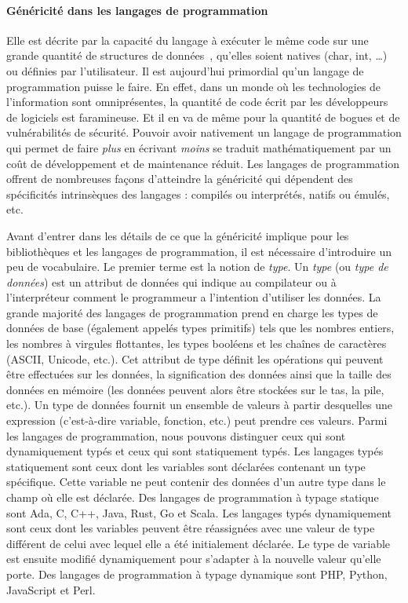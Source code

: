 \paragraph{Généricité dans les langages de programmation} Elle est décrite par la capacité du langage à exécuter le même
code sur une grande quantité de structures de données~\parencite{dehnert.1998.fundamentals}, qu'elles soient natives
(char, int, \ldots) ou définies par l'utilisateur. Il est aujourd'hui primordial qu'un langage de programmation puisse
le faire. En effet, dans un monde où les technologies de l'information sont omniprésentes, la quantité de code écrit par
les développeurs de logiciels est faramineuse. Et il en va de même pour la quantité de bogues et de vulnérabilités de
sécurité. Pouvoir avoir nativement un langage de programmation qui permet de faire \emph{plus} en écrivant \emph{moins}
se traduit mathématiquement par un coût de développement et de maintenance réduit. Les langages de programmation offrent
de nombreuses façons d'atteindre la généricité qui dépendent des spécificités intrinsèques des langages : compilés ou
interprétés, natifs ou émulés, etc.

Avant d'entrer dans les détails de ce que la généricité implique pour les bibliothèques et les langages de
programmation, il est nécessaire d'introduire un peu de vocabulaire. Le premier terme est la notion de \emph{type}. Un
\emph{type} (ou \emph{type de données}) est un attribut de données qui indique au compilateur ou à l'interpréteur
comment le programmeur a l'intention d'utiliser les données. La grande majorité des langages de programmation prend en
charge les types de données de base (également appelés types primitifs) tels que les nombres entiers, les nombres à
virgules flottantes, les types booléens et les chaînes de caractères (ASCII, Unicode, etc.). Cet attribut de type
définit les opérations qui peuvent être effectuées sur les données, la signification des données ainsi que la taille des
données en mémoire (les données peuvent alors être stockées sur le tas, la pile, etc.). Un type de données fournit un
ensemble de valeurs à partir desquelles une expression (c'est-à-dire variable, fonction, etc.) peut prendre ces valeurs.
Parmi les langages de programmation, nous pouvons distinguer ceux qui sont dynamiquement typés et ceux qui sont
statiquement typés. Les langages typés statiquement sont ceux dont les variables sont déclarées contenant un type
spécifique. Cette variable ne peut contenir des données d'un autre type dans le champ où elle est déclarée. Des langages
de programmation à typage statique sont Ada, C, C++, Java, Rust, Go et Scala. Les langages typés dynamiquement sont ceux
dont les variables peuvent être réassignées avec une valeur de type différent de celui avec lequel elle a été
initialement déclarée. Le type de variable est ensuite modifié dynamiquement pour s'adapter à la nouvelle valeur qu'elle
porte. Des langages de programmation à typage dynamique sont PHP, Python, JavaScript et Perl.

